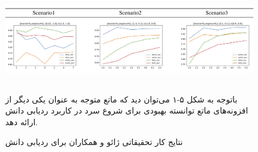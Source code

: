 \begin{figure}[!h]
\begin{center}
\includegraphics[height=4cm]{ANTM-Results.png}
\end{center}
\caption{نتایج کار تحقیقاتی ژائو و همکاران برای ردیابی دانش\cite{zhao2020cold}}
\medskip
\small

باتوجه به شکل ۵-۱ می‌توان دید که ماتع متوجه به عنوان یکی دیگر از افزونه‌های ماتع توانسته بهبودی برای شروع سرد در کاربرد ردیابی دانش ارائه دهد.

\end{figure}
